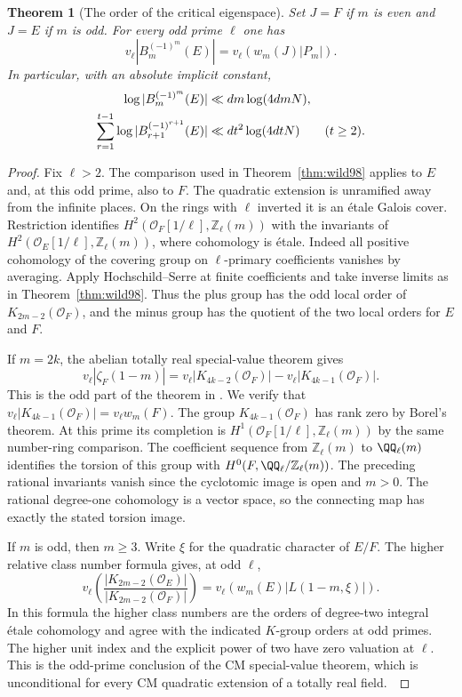 \documentclass[a4paper,11pt]{article}
\newtheorem{theorem}[proposition]{Theorem}
\theoremstyle{definition}
\theoremstyle{remark}
\newcommand{\ZZ}{\mathbb Z}\newcommand{\ord}{\operatorname{ord}}
\numberwithin{equation}{section}
\newcommand{\OO}{\mathcal O}
\begin{document}
\begin{theorem}[The order of the critical eigenspace]\leavevmode\label{thm:critical99}
Set \(J=F\) if \(m\) is even and \(J=E\) if \(m\) is odd.
For every odd prime \(\ell\) one has
\[
 v_\ell |B_m^{(-1)^m}(E)|=v_\ell\!\left(w_m(J)|P_m|\right).
\]
In particular, with an absolute implicit constant,
\begin{align}
 \log |B_m^{(-1)^m}(E)|&\ll d m\log(4dmN),\label{eq:critorder99}\\
 \sum_{r=1}^{t-1}\log |B_{r+1}^{(-1)^{r+1}}(E)|
              &\ll d t^2\log(4dtN) \qquad(t\ge2).\notag
\end{align}
\end{theorem}
\begin{proof}
Fix \(\ell>2\). The comparison used in Theorem~\ref{thm:wild98}
applies to \(E\) and, at this odd prime, also to \(F\). The quadratic
extension is unramified away from the infinite places. On the rings
with \(\ell\) inverted it is an étale Galois cover. Restriction
identifies \(H^2(\OO_F[1/\ell],\ZZ_\ell(m))\) with the invariants
of \(H^2(\OO_E[1/\ell],\ZZ_\ell(m))\), where cohomology is étale.
Indeed all positive cohomology of the covering group on
\(\ell\)-primary coefficients vanishes by averaging. Apply
Hochschild--Serre at finite coefficients and take inverse limits as
in Theorem~\ref{thm:wild98}. Thus the plus group has the odd local
order of \(K_{2m-2}(\OO_F)\), and the minus group has the quotient
of the two local orders for \(E\) and \(F\).

If \(m=2k\), the abelian totally real special-value theorem gives
\[
 v_\ell|\zeta_F(1-m)|
   =v_\ell|K_{4k-2}(\OO_F)|-v_\ell|K_{4k-1}(\OO_F)|.
\]
This is the odd part of the theorem in
\cite[Ch.~VI, Thms.~8.7--8.8]{V-III-V-weibel98}. We verify that
\(v_\ell|K_{4k-1}(\OO_F)|=v_\ell w_m(F)\).
The group \(K_{4k-1}(\OO_F)\) has rank zero
by Borel's theorem. At this prime its completion is
\(H^1(\OO_F[1/\ell],\ZZ_\ell(m))\) by the same number-ring
comparison. The coefficient sequence from \(\ZZ_\ell(m)\) to
\(\QQ_\ell(m)\) identifies the torsion of this group with
\(H^0(F,\QQ_\ell/\ZZ_\ell(m))\). The preceding rational
invariants vanish since the cyclotomic image is open and \(m>0\).
The rational degree-one cohomology is a vector space, so the
connecting map has exactly the stated torsion image.

If \(m\) is odd, then \(m\ge3\). Write \(\xi\) for the quadratic
character of \(E/F\). The higher relative class number formula
gives, at odd \(\ell\),
\[
 v_\ell\!\left(\frac{|K_{2m-2}(\OO_E)|}{|K_{2m-2}(\OO_F)|}\right)
      =v_\ell\!\left(w_m(E)|L(1-m,\xi)|\right).
\]
In this formula the higher class numbers are the orders of
degree-two integral étale cohomology and agree with the indicated
\(K\)-group orders at odd primes. The higher unit index and the
explicit power of two have zero valuation at \(\ell\).
This is the odd-prime conclusion of the CM special-value theorem,
which is unconditional for every CM quadratic extension of a totally
real field.~\cite[Prop.~1.3]{V-III-V-voight99}


\end{proof}
\end{document}
